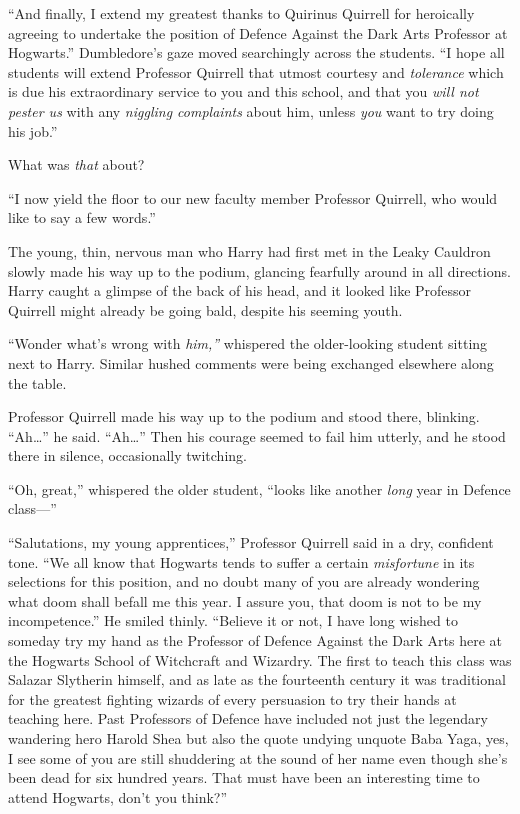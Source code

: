 ``And finally, I extend my greatest thanks to Quirinus Quirrell for
heroically agreeing to undertake the position of Defence Against the
Dark Arts Professor at Hogwarts.'' Dumbledore's gaze moved searchingly
across the students. ``I hope all students will extend Professor
Quirrell that utmost courtesy and \emph{tolerance} which is due his
extraordinary service to you and this school, and that you \emph{will
not pester us} with any \emph{niggling complaints} about him, unless
\emph{you} want to try doing his job.''

What was \emph{that} about?

``I now yield the floor to our new faculty member Professor Quirrell,
who would like to say a few words.''

The young, thin, nervous man who Harry had first met in the Leaky
Cauldron slowly made his way up to the podium, glancing fearfully around
in all directions. Harry caught a glimpse of the back of his head, and
it looked like Professor Quirrell might already be going bald, despite
his seeming youth.

``Wonder what's wrong with \emph{him,''} whispered the older-looking
student sitting next to Harry. Similar hushed comments were being
exchanged elsewhere along the table.

Professor Quirrell made his way up to the podium and stood there,
blinking. ``Ah\ldots{}'' he said. ``Ah\ldots{}'' Then his courage seemed
to fail him utterly, and he stood there in silence, occasionally
twitching.

``Oh, great,'' whispered the older student, ``looks like another
\emph{long} year in Defence class---''

``Salutations, my young apprentices,'' Professor Quirrell said in a dry,
confident tone. ``We all know that Hogwarts tends to suffer a certain
\emph{misfortune} in its selections for this position, and no doubt many
of you are already wondering what doom shall befall me this year. I
assure you, that doom is not to be my incompetence.'' He smiled thinly.
``Believe it or not, I have long wished to someday try my hand as the
Professor of Defence Against the Dark Arts here at the Hogwarts School
of Witchcraft and Wizardry. The first to teach this class was Salazar
Slytherin himself, and as late as the fourteenth century it was
traditional for the greatest fighting wizards of every persuasion to try
their hands at teaching here. Past Professors of Defence have included
not just the legendary wandering hero Harold Shea but also the quote
undying unquote Baba Yaga, yes, I see some of you are still shuddering
at the sound of her name even though she's been dead for six hundred
years. That must have been an interesting time to attend Hogwarts, don't
you think?''

